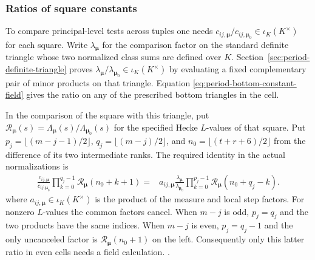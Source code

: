 %
\subsubsection{Ratios of square constants}
To compare principal-level tests across tuples one needs
\(c_{ij,\boldsymbol\mu}/c_{ij,\boldsymbol\mu_0}\in\iota_K(K^\times)\)
for each square. Write \(\lambda_{\boldsymbol\mu}\) for the
comparison factor on the standard definite triangle whose two
normalized class sums are defined over \(K\).
Section~\ref{sec:period-definite-triangle} proves
\(\lambda_{\boldsymbol\mu}/\lambda_{\boldsymbol\mu_0}
\in\iota_K(K^\times)\) by evaluating a fixed complementary pair of
minor products on that triangle. Equation
\eqref{eq:period-bottom-constant-field} gives the ratio on any of
the prescribed bottom triangles in the cell.

In the comparison of the square with this triangle, put
\(\mathcal R_{\boldsymbol\mu}(s)=
\Lambda_{\boldsymbol\mu}(s)/\Lambda_{\boldsymbol\mu_0}(s)\) for the
specified Hecke \(L\)-values of that square. Put
\(p_j=\lfloor(m-j-1)/2\rfloor\), \(q_j=\lfloor(m-j)/2\rfloor\),
and \(n_0=\lfloor(t+r+6)/2\rfloor\) from the difference of
its two intermediate ranks. The
required identity in the actual normalizations is
\begin{equation}
\label{eq:period-square-ratios}
\begin{split}
 \frac{c_{ij,\boldsymbol\mu}}{c_{ij,\boldsymbol\mu_0}}
 \prod_{k=0}^{q_j-1}\mathcal R_{\boldsymbol\mu}(n_0+k+1)
  ={}& a_{ij,\boldsymbol\mu}
       \frac{\lambda_{\boldsymbol\mu}}{\lambda_{\boldsymbol\mu_0}}
       \prod_{k=0}^{p_j-1}\mathcal R_{\boldsymbol\mu}(n_0+q_j-k).
\end{split}
\end{equation}
where \(a_{ij,\boldsymbol\mu}\in\iota_K(K^\times)\) is the product of
the measure and local step factors. For nonzero \(L\)-values the
common factors cancel. When \(m-j\) is odd, \(p_j=q_j\) and the two
products have the same indices. When \(m-j\) is even, \(p_j=q_j-1\)
and the only uncanceled factor is
\(\mathcal R_{\boldsymbol\mu}(n_0+1)\) on the left. Consequently
only this latter ratio in even cells needs a field calculation.
.


